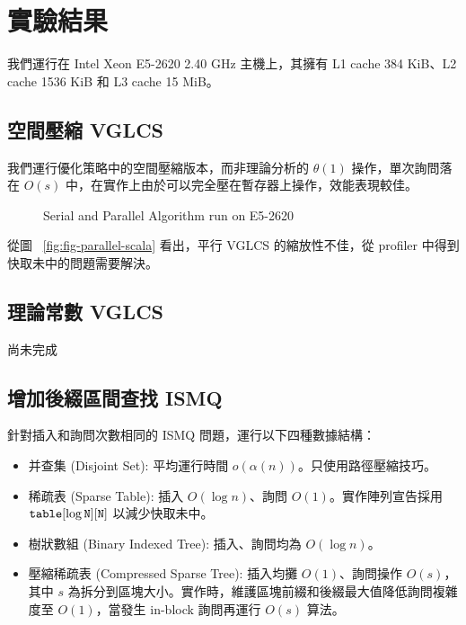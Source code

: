 \documentclass{gapd}
\begin{document}
\section{實驗結果}
\label{sec:Experiment}

我們運行在 Intel Xeon E5-2620 2.40 GHz 主機上，其擁有 L1 cache 384 KiB、L2 cache 1536 KiB 和 L3 cache 15 MiB。

\subsection{空間壓縮 VGLCS}

我們運行優化策略中的空間壓縮版本，而非理論分析的 $\theta(1)$ 操作，單次詢問落在 $O(s)$ 中，在實作上由於可以完全壓在暫存器上操作，效能表現較佳。

\begin{figure*}[!thb]
  \centering
  \subfigure[Runtime]{
    
    \label{fig:fig-parallel}
  }
  \subfigure[Scalability]{
    
    \label{fig:fig-parallel-scala}
  }
  \caption{Serial and Parallel Algorithm run on E5-2620}
\end{figure*}

從圖 ~\ref{fig:fig-parallel-scala} 看出，平行 VGLCS 的縮放性不佳，從 profiler 中得到快取未中的問題需要解決。

\subsection{理論常數 VGLCS}

尚未完成

\subsection{增加後綴區間查找 ISMQ}

針對插入和詢問次數相同的 ISMQ 問題，運行以下四種數據結構：

\begin{itemize}
  \item 并查集 (Disjoint Set): 平均運行時間 $o(\alpha(n))$。只使用路徑壓縮技巧。
  \item 稀疏表 (Sparse Table): 插入 $O(\log n)$、詢問 $O(1)$。實作陣列宣告採用 $\tt{table}[\log N][N]$ 以減少快取未中。
  \item 樹狀數組 (Binary Indexed Tree): 插入、詢問均為 $O(\log n)$。
  \item 壓縮稀疏表 (Compressed Sparse Tree): 插入均攤 $O(1)$、詢問操作 $O(s)$，其中 $s$ 為拆分到區塊大小。實作時，維護區塊前綴和後綴最大值降低詢問複雜度至 $O(1)$，當發生 in-block 詢問再運行 $O(s)$ 算法。
\end{itemize}
\end{document}
